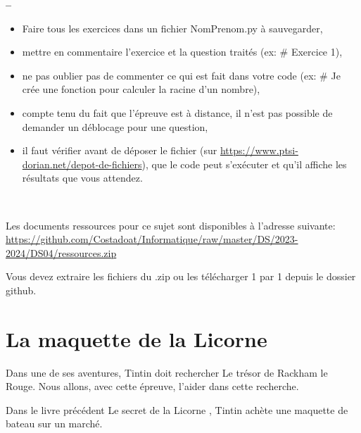 

\begin{center}
{\Large\bf {\type} \no {\numero} -- \descrip}
\end{center}


\begin{boxedminipage}{.9\textwidth} 
\begin{itemize}
 \item Faire tous les exercices dans un fichier {NomPrenom.py} à sauvegarder,
 \item mettre en commentaire l'exercice et la question traités (ex: \# Exercice 1),
 \item ne pas oublier pas de commenter ce qui est fait dans votre code (ex: \# Je crée une fonction pour calculer la racine d'un nombre),
 \item compte tenu du fait que l'épreuve est à distance, il n'est pas possible de demander un déblocage pour une question,
 \item il faut vérifier avant de déposer le fichier (sur \href{https://www.ptsi-dorian.net/depot-de-fichiers}{https://www.ptsi-dorian.net/depot-de-fichiers}), que le code peut s'exécuter et qu'il affiche les résultats que vous attendez.
\end{itemize}
\end{boxedminipage}

~\

Les documents ressources pour ce sujet sont disponibles à l'adresse suivante: \\
\href{https://github.com/Costadoat/Informatique/raw/master/DS/2023-2024/DS04/ressources.zip}{https://github.com/Costadoat/Informatique/raw/master/DS/2023-2024/DS04/ressources.zip}

Vous devez extraire les fichiers du .zip ou les télécharger 1 par 1 depuis le dossier github.

\vspace{-0.5cm}

\section{La maquette de la Licorne}

Dans une de ses aventures, Tintin doit rechercher \og Le trésor de Rackham le Rouge\fg. Nous allons, avec cette épreuve, l'aider dans cette recherche.

Dans le livre précédent \og Le secret de la Licorne \fg, Tintin achète une maquette de bateau sur un marché.

